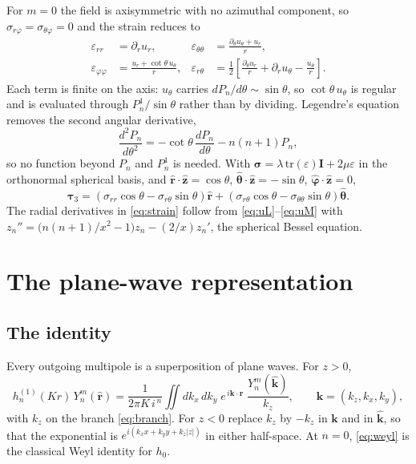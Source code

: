 \documentclass[11pt,a4paper]{article}
\newcommand{\bI}{\mathbf{I}}
\newcommand{\bk}{\mathbf{k}}
\newcommand{\br}{\mathbf{r}}
\newcommand{\bta}{\boldsymbol{\tau}}
\newcommand{\bsig}{\boldsymbol{\sigma}}
\newcommand{\khat}{\hat{\bk}}
\newcommand{\rhat}{\hat{\br}}
\newcommand{\zhat}{\hat{\mathbf{z}}}
\begin{document}
For $m=0$ the field is axisymmetric with no azimuthal component, so
$\sigma_{r\varphi} = \sigma_{\theta\varphi} = 0$ and the strain reduces to
\begin{equation}\label{eq:strain}
\begin{aligned}
  \varepsilon_{rr} &= \partial_r u_r, &
  \varepsilon_{\theta\theta} &= \frac{\partial_\theta u_\theta + u_r}{r}, \\
  \varepsilon_{\varphi\varphi} &= \frac{u_r + \cot\theta\,u_\theta}{r}, &
  \varepsilon_{r\theta} &= \tfrac12\!\left[\frac{\partial_\theta u_r}{r}
     + \partial_r u_\theta - \frac{u_\theta}{r}\right].
\end{aligned}
\end{equation}
Each term is finite on the axis: $u_\theta$ carries $dP_n/d\theta\sim\sin\theta$,
so $\cot\theta\,u_\theta$ is regular and is evaluated through
$P_n^1/\sin\theta$ rather than by dividing.  Legendre's equation removes the
second angular derivative,
\begin{equation}\label{eq:d2P}
  \frac{d^2P_n}{d\theta^2} = -\cot\theta\,\frac{dP_n}{d\theta} - n(n+1)P_n ,
\end{equation}
so no function beyond $P_n$ and $P_n^1$ is needed.  With
$\bsig = \lambda\,\mathrm{tr}(\varepsilon)\bI + 2\mu\varepsilon$ in the
orthonormal spherical basis, and $\rhat\cdot\zhat = \cos\theta$,
$\hat{\boldsymbol\theta}\cdot\zhat = -\sin\theta$,
$\hat{\boldsymbol\varphi}\cdot\zhat = 0$,
\begin{equation}\label{eq:tau3sph}
  \bta_3 = \left(\sigma_{rr}\cos\theta - \sigma_{r\theta}\sin\theta\right)\rhat
   + \left(\sigma_{r\theta}\cos\theta - \sigma_{\theta\theta}\sin\theta\right)
     \hat{\boldsymbol\theta}.
\end{equation}
The radial derivatives in \eqref{eq:strain} follow from
\eqref{eq:uL}--\eqref{eq:uM} with
$z_n'' = \big(n(n+1)/x^2 - 1\big)z_n - (2/x)z_n'$, the spherical Bessel
equation.

\section{The plane-wave representation}\label{sec:weyl}

\subsection{The identity}

Every outgoing multipole is a superposition of plane waves.  For $z > 0$,
\begin{equation}\label{eq:weyl}
  h^{(1)}_n(Kr)\,Y_n^m(\rhat)
   = \frac{1}{2\pi K\,i^{\,n}}
     \iint dk_x\,dk_y\;
     e^{\,i\bk\cdot\br}\;
     \frac{Y_n^m(\khat)}{k_z},
   \qquad \bk = (k_z,k_x,k_y),
\end{equation}
with $k_z$ on the branch \eqref{eq:branch}.  For $z < 0$ replace $k_z$ by
$-k_z$ in $\bk$ and in $\khat$, so that the exponential is
$e^{i(k_xx + k_yy + k_z|z|)}$ in either half-space.  At $n=0$, \eqref{eq:weyl}
is the classical Weyl identity for $h_0$.
\end{document}
